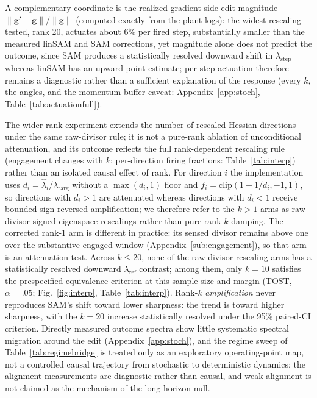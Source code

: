 \documentclass{article}
\theoremstyle{plain}
\theoremstyle{definition}
\theoremstyle{remark}
\newcommand{\lref}{\ensuremath{\lambda_{\mathrm{ref}}}}
\newcommand{\lstep}{\ensuremath{\lambda_{\mathrm{step}}}}
\begin{document}
A complementary coordinate is the realized gradient-side edit
magnitude $\|\mathbf{g}'-\mathbf{g}\|/\|\mathbf{g}\|$ (computed
exactly from the plant logs): the widest rescaling tested, rank 20,
actuates about $6\%$ per fired step, substantially smaller than the
measured linSAM and SAM corrections, yet magnitude alone does not
predict the outcome, since SAM produces a statistically resolved
downward shift in $\lstep$ whereas linSAM has an upward point
estimate; per-step actuation therefore remains a diagnostic rather
than a sufficient explanation of the response (every $k$, the
angles, and the momentum-buffer caveat:
Appendix~\ref{app:stoch}, Table~\ref{tab:actuationfull}).

The wider-rank experiment extends the number of rescaled Hessian
directions under the same raw-divisor rule; it is not a pure-rank
ablation of unconditional attenuation, and its outcome reflects the
full rank-dependent rescaling rule (engagement changes with $k$;
per-direction firing fractions: Table~\ref{tab:interp}) rather than
an isolated causal effect of rank. For direction $i$ the
implementation uses $d_{i}=\hat\lambda_{i}/\lambda_{\mathrm{targ}}$
without a $\max(d_{i},1)$ floor and
$f_{i}=\mathrm{clip}(1-1/d_{i},-1,1)$, so directions with $d_{i}>1$
are attenuated whereas directions with $d_{i}<1$ receive bounded
sign-reversed amplification; we therefore refer to the $k{>}1$ arms as
raw-divisor signed eigenspace rescalings rather than pure rank-$k$
damping. The corrected rank-1 arm is different in practice: its sensed
divisor remains above one over the substantive engaged window
(Appendix~\ref{sub:engagement}), so that arm is an attenuation test.
Across $k{\le}20$, none of the raw-divisor rescaling arms has a
statistically resolved downward $\lref$ contrast; among them, only
$k{=}10$ satisfies the prespecified equivalence
criterion at this sample size and margin (TOST, $\alpha{=}.05$;
Fig.~\ref{fig:interp}, Table~\ref{tab:interp}). Rank-$k$
\emph{amplification} never reproduces SAM's shift toward lower
sharpness: the trend is toward higher sharpness, with the $k{=}20$
increase statistically resolved under the 95\% paired-CI criterion.
Directly measured outcome spectra show little
systematic spectral migration around the edit
(Appendix~\ref{app:stoch}), and the regime sweep of
Table~\ref{tab:regimebridge} is treated only as an exploratory
operating-point map, not a controlled causal trajectory from
stochastic to deterministic dynamics: the alignment measurements are
diagnostic rather than causal, and weak alignment is not claimed as
the mechanism of the long-horizon null.
\end{document}
